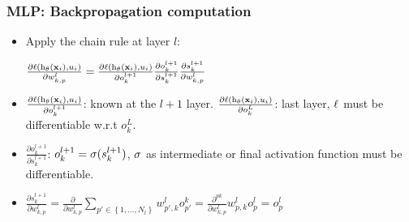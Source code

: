 \begin{frame}
  \frametitle{\acl{MLP}: Backpropagation computation}
  \begin{itemize}
    \item Apply the chain rule at layer $l$:

    $
    \frac{\partial \mathrm{\ell} \left ( {\mathrm{h}_{\mathbf{\theta}} \left ( {\mathbf{x}_i} \right ), u_i} \right ) }{\partial w_{k,p}^l} =
    \frac{\partial \mathrm{\ell} \left ( {\mathrm{h}_{\mathbf{\theta}} \left ( {\mathbf{x}_i} \right ), u_i} \right )}{\partial o_k^{l+1}} \frac{\partial o_k^{l+1}}{\partial s_k^{l+1}} \frac{\partial s_k^{l+1}}{\partial w_{k,p}^{l}}
    $

    \item $\frac{\partial \mathrm{\ell} \left ( {\mathrm{h}_{\mathbf{\theta}} \left ( {\mathbf{x}_i} \right ), u_i} \right )}{\partial o_k^{l+1}}$: known at the $l+1$ layer. $\frac{\partial \mathrm{\ell} \left ( {\mathrm{h}_{\mathbf{\theta}} \left ( {\mathbf{x}_i} \right ), u_i} \right )}{\partial o_k^{L}}$: last layer, $\mathrm{\ell}$ must be differentiable w.r.t $o_k^{L}$.


    \item $\frac{\partial o_k^{l+1}}{\partial s_k^{l+1}}$: $o_k^{l+1} = \mathrm{\sigma}(s_k^{l+1})$, $\mathrm{\sigma}$ as intermediate or final activation function must be differentiable.

    \item $\frac{\partial s_k^{l+1}}{\partial w_{k,p}^{l}} = \frac{\partial}{\partial w_{k,p}^{l}} \sum_{p' \in \left\{1,\ldots,N_l \right\}}  w_{p', k}^{l}o_{p'}^{k}= \frac{\partial^{pk} }{\partial w_{k,p}^{l}}  w_{p, k}^{l}o_{p}^{l}=o_{p}^{l}$

  \end{itemize}

\end{frame}
